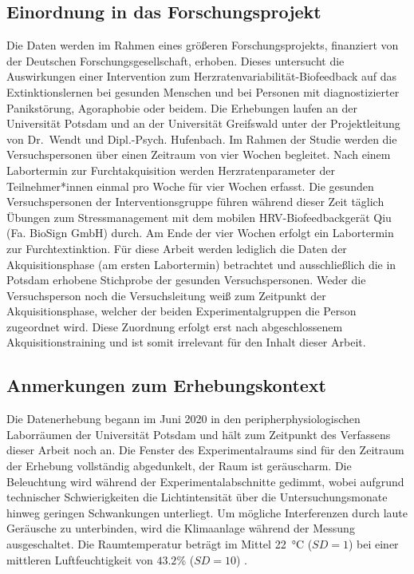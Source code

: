 			\subsection{Einordnung in das Forschungsprojekt}\label{hrvbfb}
						Die Daten werden im Rahmen eines größeren Forschungsprojekts, finanziert von der Deutschen Forschungsgesellschaft, erhoben. Dieses untersucht die Auswirkungen einer Intervention zum Herzratenvariabilität-Biofeedback auf das Extinktionslernen bei gesunden Menschen und bei Personen mit diagnostizierter Panikstörung, Agoraphobie oder beidem. %
						Die Erhebungen laufen an der Universität Potsdam und an der Universität Greifswald unter der Projektleitung von Dr.~Wendt und Dipl.-Psych.  Hufenbach. 
						Im Rahmen der Studie werden die Versuchspersonen über einen Zeitraum von vier Wochen begleitet. Nach einem Labortermin zur Furchtakquisition werden Herzratenparameter der Teilnehmer*innen einmal pro Woche für vier Wochen erfasst. Die gesunden Versuchspersonen der Interventionsgruppe führen während dieser Zeit täglich Übungen zum Stressmanagement mit dem mobilen HRV-Biofeedbackgerät Qiu (Fa. BioSign GmbH) durch. Am Ende der vier Wochen erfolgt ein Labortermin zur Furchtextinktion. 
						Für diese Arbeit werden lediglich die Daten der Akquisitionsphase (am ersten Labortermin) betrachtet und ausschließlich die in Potsdam erhobene Stichprobe der gesunden Versuchspersonen. Weder die Versuchsperson noch die Versuchsleitung weiß zum Zeitpunkt der Akquisitionsphase, welcher der beiden Experimentalgruppen die Person zugeordnet wird. Diese Zuordnung erfolgt erst nach abgeschlossenem Akquisitionstraining und ist somit irrelevant für den Inhalt dieser Arbeit.
						
			\subsection{Anmerkungen zum Erhebungskontext}\label{context}
						Die Datenerhebung begann im Juni 2020 in den peripherphysiologischen Laborräumen der Universität Potsdam und hält zum Zeitpunkt des Verfassens dieser Arbeit noch an. Die Fenster des Experimentalraums sind für den Zeitraum der Erhebung vollständig abgedunkelt, der Raum ist geräuscharm. Die Beleuchtung wird während der Experimentalabschnitte gedimmt, wobei aufgrund technischer Schwierigkeiten die Lichtintensität über die Untersuchungsmonate hinweg geringen Schwankungen unterliegt. Um mögliche Interferenzen durch laute Geräusche zu unterbinden, wird die Klimaanlage während der Messung ausgeschaltet. Die Raumtemperatur beträgt im Mittel \SI{22}{\degreeCelsius} ($SD=1$) bei einer mittleren Luftfeuchtigkeit von $43.2$\si{\percent} ($SD=10$) .
						
